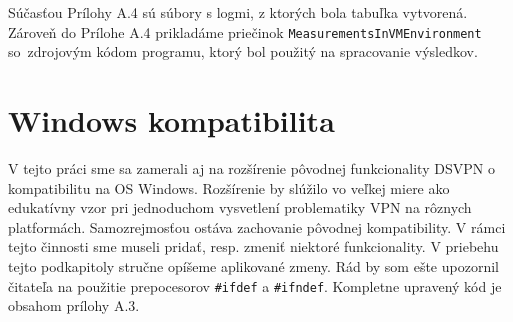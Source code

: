 \begin{table}[h!]
	\centering
	\caption{Výsledky z experimentálnych meraní funkcií na šifrovanie a dešifrovanie v prostredí virtuálnych strojov}
	\label{tabmer}
\end{table}

Súčasťou Prílohy A.4 sú súbory s logmi, z ktorých bola tabuľka vytvorená. Zároveň do Prílohe A.4 prikladáme priečinok \lstinline|MeasurementsInVMEnvironment| so~zdrojovým kódom programu, ktorý bol použitý na spracovanie výsledkov.  
\section{Windows kompatibilita}
V tejto práci sme sa zamerali aj na rozšírenie pôvodnej funkcionality DSVPN o kompatibilitu na OS Windows. Rozšírenie by slúžilo vo veľkej miere ako edukatívny vzor pri jednoduchom vysvetlení problematiky VPN na rôznych platformách. Samozrejmosťou ostáva zachovanie pôvodnej kompatibility. V rámci tejto činnosti sme museli pridať, resp. zmeniť niektoré funkcionality. V priebehu tejto podkapitoly stručne opíšeme aplikované zmeny. Rád by som ešte upozornil čitateľa na použitie prepocesorov \lstinline|#ifdef| a \lstinline|#ifndef|. Kompletne upravený kód je obsahom prílohy A.3.

